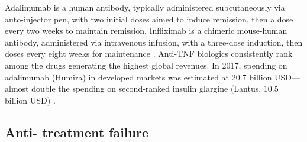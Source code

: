 Adalimumab is a human antibody, typically administered subcutaneously via auto-injector pen, with two initial doses aimed to induce remission, then a dose every two weeks to maintain remission. 
Infliximab is a chimeric mouse-human antibody, administered via intravenous infusion, with a three-dose induction, then doses every eight weeks for maintenance \autocite{adegbola2018AntiTNFTherapyCrohn}.
Anti-\gls{TNF} biologics consistently rank among the drugs generating the highest global revenues.
In 2017, spending on adalimumab (Humira) in developed markets was estimated at 20.7 billion USD---almost double the spending on second-ranked insulin glargine (Lantus, 10.5 billion USD) \autocite{aitken2019GlobalUseMedicine}.


\subsection{Anti- treatment failure}

